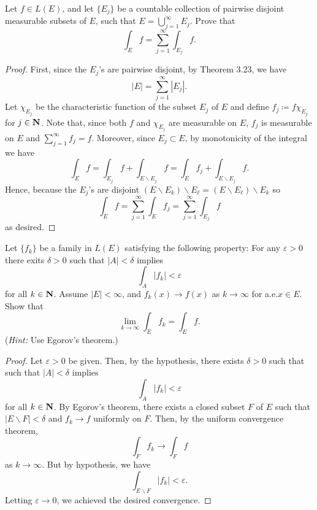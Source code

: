 \begin{problem}
Let $f\in L(E)$, and let $\{E_j\}$ be a countable collection of pairwise
disjoint measurable subsets of $E$, such that $E=\bigcup_{j=1}^\infty
E_j$. Prove that
\[
\int_E f=\sum_{j=1}^\infty\int_{E_j}f.
\]
\end{problem}
\begin{proof}
First, since the $E_j$'s are pairwise disjoint, by Theorem 3.23, we have
\begin{equation}
\label{eq:disjoint-measure-2-2}
|E|=\sum_{j=1}^\infty|E_j|.
\end{equation}
Let $\chi_{E_j}$ be the characteristic function of the subset $E_j$ of
$E$ and define $f_j\coloneqq f\chi_{E_j}$ for $j\in\mathbf{N}$. Note that, since
both $f$ and $\chi_{E_j}$ are measurable on $E$, $f_j$ is
measurable on $E$ and $\sum_{j=1}^\infty f_j=f$. Moreover, since
$E_j\subset E$, by monotonicity of the integral we have
\begin{equation}
\label{eq:monotonicity-2-2}
\int_{E} f=
\int_{E_j} f+\int_{E\smallsetminus E_j}f=
\int_E f_j+\int_{E\smallsetminus E_j}f.
\end{equation}
Hence, because the $E_j$'s are disjoint $(E\smallsetminus E_k)\smallsetminus
E_\ell=(E\smallsetminus E_\ell)\smallsetminus E_k$ so
\begin{equation}
\label{eq:desired-sum-2}
\int_E f=\sum_{j=1}^\infty\int_E f_j=\sum_{j=1}^\infty\int_{E_j}f
\end{equation}
as desired.
\end{proof}

\begin{problem}
Let $\{f_k\}$ be a family in $L(E)$ satisfying the following property:
For any $\varepsilon>0$ there exits $\delta>0$ such that $|A|<\delta$
implies
\[
\int_A |f_k|<\varepsilon
\]
for all $k\in\mathbf{N}$. Assume $|E|<\infty$, and $f_k(x)\to f(x)$ as
$k\to\infty$ for a.e.\@ $x\in E$. Show that
\[
\lim_{k\to\infty}\int_E f_k=\int_E f.
\]
(\emph{Hint:} Use Egorov's theorem.)
\end{problem}
\begin{proof}
Let $\varepsilon>0$ be given. Then, by the hypothesis, there exists
$\delta>0$ such that
such that $|A|<\delta$
implies
\begin{equation}
  \label{eq:hypothesis-2-3}
\int_A |f_k|<\varepsilon
\end{equation}
for all $k\in\mathbf{N}$. By Egorov's theorem, there exists a closed subset $F$
of $E$ such that $|E\smallsetminus F|<\delta$ and $f_k\to f$ uniformly on
$F$. Then, by the uniform convergence theorem,
\begin{equation}
\label{eq:uniform-convergence-2-3}
\int_F f_k\longrightarrow \int_F f
\end{equation}
as $k\to\infty$. But by hypothesis, we have
\begin{equation}
\label{eq:need-to-show-2-}
\int_{E\smallsetminus F} |f_k|<\varepsilon.
\end{equation}
Letting $\varepsilon\to 0$, we achieved the desired convergence.
\end{proof}

